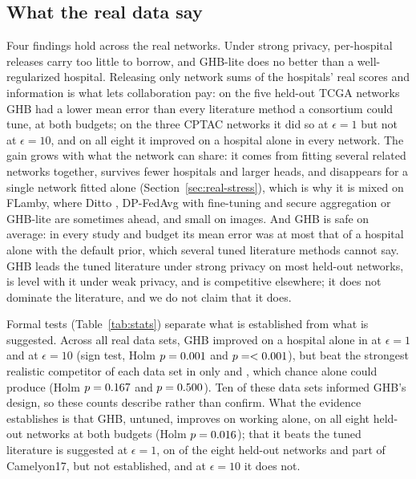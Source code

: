 \subsection{What the real data say}\label{sec:real-summary}

Four findings hold across the real networks. Under strong privacy, per-hospital releases carry too little to borrow, and GHB-lite does no better than a well-regularized hospital. Releasing only network sums of the hospitals' real scores and information is what lets collaboration pay: on the five held-out TCGA networks GHB had a lower mean error than every literature method a consortium could tune, at both budgets; on the three CPTAC networks it did so at $\epsilon=1$ but not at $\epsilon=10$, and on all eight it improved on a hospital alone in every network. The gain grows with what the network can share: it comes from fitting several related networks together, survives fewer hospitals and larger heads, and disappears for a single network fitted alone (Section~\ref{sec:real-stress}), which is why it is mixed on FLamby, where Ditto \cite{li2021ditto}, DP-FedAvg \cite{mcmahan2018learning} with fine-tuning and secure aggregation or GHB-lite are sometimes ahead, and small on images. And GHB is safe on average: in every study and budget its mean error was at most that of a hospital alone with the default prior, which several tuned literature methods cannot say. GHB leads the tuned literature under strong privacy on most held-out networks, is level with it under weak privacy, and is competitive elsewhere; it does not dominate the literature, and we do not claim that it does.

Formal tests (Table~\ref{tab:stats}) separate what is established from what is suggested. Across all \SimStAllN{} real data sets, GHB improved on a hospital alone in \SimStAllOneLocWins{} at $\epsilon=1$ and \SimStAllTenLocWins{} at $\epsilon=10$ (sign test, Holm $p=0.001$ and $p=<0.001$), but beat the strongest realistic competitor of each data set in only \SimStAllOneRealWins{} and \SimStAllTenRealWins, which chance alone could produce (Holm $p=0.167$ and $p=0.500$). Ten of these data sets informed GHB's design, so these counts describe rather than confirm. What the evidence establishes is that GHB, untuned, improves on working alone, on all eight held-out networks at both budgets (Holm $p=0.016$); that it beats the tuned literature is suggested at $\epsilon=1$, on \SimStHOneRealWins{} of the eight held-out networks and part of Camelyon17, but not established, and at $\epsilon=10$ it does not.

